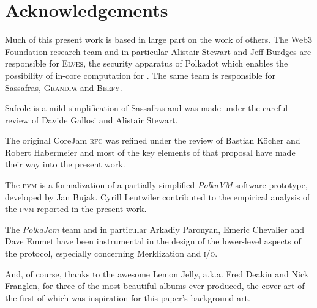 \section{Acknowledgements}

Much of this present work is based in large part on the work of others. The Web3 Foundation research team and in particular Alistair Stewart and Jeff Burdges are responsible for \textsc{Elves}, the security apparatus of Polkadot which enables the possibility of in-core computation for \Jam. The same team is responsible for Sassafras, \textsc{Grandpa} and \textsc{Beefy}.    

Safrole is a mild simplification of Sassafras and was made under the careful review of Davide Gallosi and Alistair Stewart.

The original CoreJam \textsc{rfc} was refined under the review of Bastian Köcher and Robert Habermeier and most of the key elements of that proposal have made their way into the present work.

The \textsc{pvm} is a formalization of a partially simplified \emph{PolkaVM} software prototype, developed by Jan Bujak. Cyrill Leutwiler contributed to the empirical analysis of the \textsc{pvm} reported in the present work.

The \emph{PolkaJam} team and in particular Arkadiy Paronyan, Emeric Chevalier and Dave Emmet have been instrumental in the design of the lower-level aspects of the \Jam protocol, especially concerning Merklization and \textsc{i/o}.

And, of course, thanks to the awesome Lemon Jelly, a.k.a. Fred Deakin and Nick Franglen, for three of the most beautiful albums ever produced, the cover art of the first of which was inspiration for this paper's background art.
